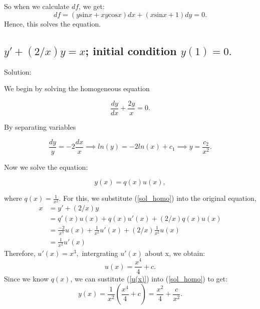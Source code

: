 \documentclass{article}
\begin{document}
		
		So when we calculate $df$, we get:
		\[ df = (y\text{sin}x + xy\text{cos}x)dx + (x\text{sin}x + 1)dy =0.\]
		Hence, this solves the equation.
		
		\subsection{$y' + (2/x)y = x$; initial condition $y(1)=0.$}

		Solution:

		We begin by solving the homogeneous equation

		\[ \frac{dy}{dx} + \frac{2y}{x} = 0.\]

		By separating variables  %

		\[\frac{dy}{y} = -2\frac{dx}{x} \implies ln(y) = -2ln(x) + c_1 \implies y = \frac{c_2}{x^2}.\]

		Now we solve the equation:

		\begin{equation} \label{sol_homo}
			y(x) = q(x)u(x),
		\end{equation}

		where $q(x) = \frac{1}{x^2}$. For this, we substitute (\ref{sol_homo}) into the original equation,
       \begin{equation*}
	         \begin{aligned}
	        	x&=y' + (2/x)y \\
	        	&=q'(x)u(x) +q(x)u'(x) + (2/x)q(x)u(x) \\
	        	&=\frac{-2}{x^3}	u(x) +\frac{1}{x^2}u'(x) + (2/x)\frac{1}{x^2}u(x)\\
	        	&=\frac{1}{x^2}u'(x)
	         \end{aligned}
       \end{equation*}
    Therefore, $u'(x) = x^3, $ intergrating $u'(x)$ about x, we obtain:
        \begin{equation}\label{u(x)}
        	u(x) = \frac{x^4}{4} + c .
        \end{equation} 
		Since we know $q(x)$, we can sustitute (\ref{u(x)}) into (\ref{sol_homo}) to get:
		\[y(x) = \frac{1}{x^2}\left(\frac{x^4}{4}+c\right) = \frac{x^2}{4} + \frac{c}{x^2}.\]
\end{document}
